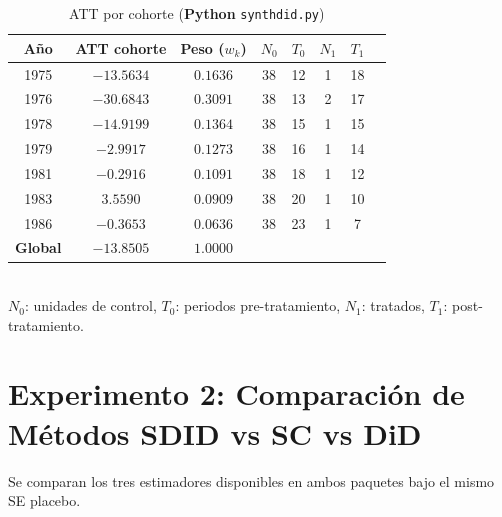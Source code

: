\documentclass[11pt, a4paper]{article}
\newcommand{\py}{\textcolor{pyblue}{\textbf{Python}}}
\begin{document}
\begin{table}[H]
\centering
\caption{ATT por cohorte (\py{} \texttt{synthdid.py})}
\begin{tabular}{cccccccc}
\toprule
Año & ATT cohorte & Peso ($w_k$) & $N_0$ & $T_0$ & $N_1$ & $T_1$ \\
\midrule
1975 & $-13.5634$ & $0.1636$ & 38 & 12 & 1 & 18 \\
1976 & $-30.6843$ & $0.3091$ & 38 & 13 & 2 & 17 \\
1978 & $-14.9199$ & $0.1364$ & 38 & 15 & 1 & 15 \\
1979 & $ -2.9917$ & $0.1273$ & 38 & 16 & 1 & 14 \\
1981 & $ -0.2916$ & $0.1091$ & 38 & 18 & 1 & 12 \\
1983 & $  3.5590$ & $0.0909$ & 38 & 20 & 1 & 10 \\
1986 & $ -0.3653$ & $0.0636$ & 38 & 23 & 1 &  7 \\
\midrule
\textbf{Global} & $\mathbf{-13.8505}$ & $1.0000$ & & & & \\
\bottomrule
\end{tabular}\\[0.4em]
{\small $N_0$: unidades de control, $T_0$: periodos pre-tratamiento, $N_1$: tratados, $T_1$: post-tratamiento.}
\end{table}

\newpage
\section{Experimento 2: Comparación de Métodos SDID vs SC vs DiD}

Se comparan los tres estimadores disponibles en ambos paquetes bajo el mismo SE placebo.
\end{document}
